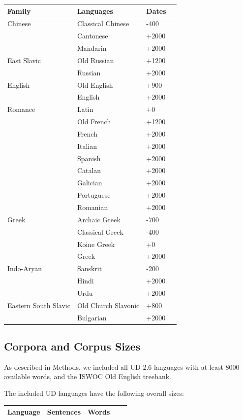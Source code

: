 \documentclass[11pt,a4paper]{article}
\begin{document}
\begin{tabular}{llll} \hline
Family & Languages & Dates \\ \hline\hline
Chinese & Classical Chinese & -400  \\
& Cantonese & +2000\\ 
& Mandarin & +2000 \\ \hline
East Slavic & Old Russian & +1200 \\
& Russian & +2000 \\ \hline
English & Old English & +900 \\
& English  & +2000\\ \hline
Romance & Latin &+0  \\
& Old French &+1200\\
& French  & +2000\\
& Italian & +2000\\
& Spanish & +2000\\
& Catalan & +2000\\
& Galician & +2000\\
& Portuguese & +2000\\
& Romanian & +2000\\ \hline
Greek & Archaic Greek & -700 \\
      & Classical Greek & -400 \\
      & Koine Greek & +0\\
& Greek  & +2000\\ \hline
Indo-Aryan & Sanskrit & -200 \\
& Hindi  & +2000\\
& Urdu  & +2000\\ \hline
Eastern South Slavic & Old Church Slavonic & +800 \\
& Bulgarian  & +2000\\ \hline
\end{tabular}


\subsection{Corpora and Corpus Sizes}

As described in Methods, we included all UD 2.6 languages with at least 8000 available words, and the ISWOC Old English treebank.

The included UD languages have the following overall sizes:

\begin{longtable}{lllll}
Language & Sentences & Words \\ \hline

\end{longtable}
\end{document}
